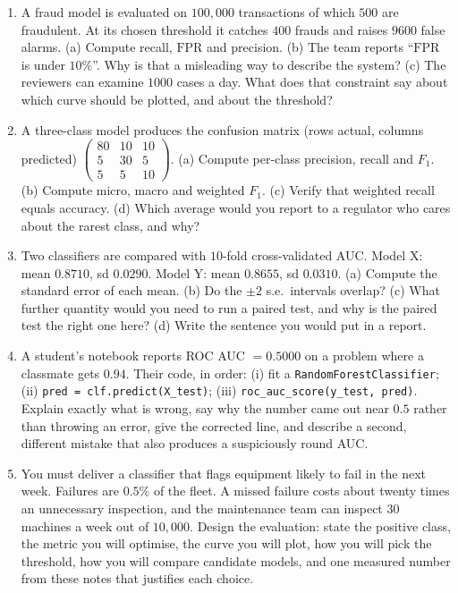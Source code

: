 \documentclass[11pt]{article}
\newcommand{\FPR}{\mathrm{FPR}}
\begin{document}
\begin{enumerate}[leftmargin=*]
  \item\label{q:pr} A fraud model is evaluated on $100{,}000$ transactions of
    which $500$ are fraudulent. At its chosen threshold it catches $400$ frauds
    and raises $9600$ false alarms. (a) Compute recall, $\FPR$ and precision.
    (b) The team reports ``$\FPR$ is under $10\%$''. Why is that a misleading
    way to describe the system? (c) The reviewers can examine $1000$ cases a
    day. What does that constraint say about which curve should be plotted, and
    about the threshold?

  \item\label{q:multi} A three-class model produces the confusion matrix
    (rows actual, columns predicted)
    $\begin{pmatrix} 80 & 10 & 10\\ 5 & 30 & 5\\ 5 & 5 & 10 \end{pmatrix}$.
    (a) Compute per-class precision, recall and $F_1$. (b) Compute micro, macro
    and weighted $F_1$. (c) Verify that weighted recall equals accuracy.
    (d) Which average would you report to a regulator who cares about the rarest
    class, and why?

  \item\label{q:select} Two classifiers are compared with $10$-fold
    cross-validated AUC. Model X: mean $0.8710$, sd $0.0290$. Model Y: mean
    $0.8655$, sd $0.0310$. (a) Compute the standard error of each mean. (b) Do
    the $\pm 2$ s.e.\ intervals overlap? (c) What further quantity would you need
    to run a paired test, and why is the paired test the right one here?
    (d) Write the sentence you would put in a report.

  \item\label{q:debug} A student's notebook reports ROC AUC $= 0.5000$ on a
    problem where a classmate gets $0.94$. Their code, in order: (i) fit a
    \texttt{RandomForestClassifier}; (ii) \texttt{pred = clf.predict(X\_test)};
    (iii) \texttt{roc\_auc\_score(y\_test, pred)}. Explain exactly what is wrong,
    say why the number came out near $0.5$ rather than throwing an error, give
    the corrected line, and describe a second, different mistake that also
    produces a suspiciously round AUC.

  \item\label{q:design} You must deliver a classifier that flags equipment
    likely to fail in the next week. Failures are $0.5\%$ of the fleet. A missed
    failure costs about twenty times an unnecessary inspection, and the
    maintenance team can inspect $30$ machines a week out of $10{,}000$. Design
    the evaluation: state the positive class, the metric you will optimise, the
    curve you will plot, how you will pick the threshold, how you will compare
    candidate models, and one measured number from these notes that justifies
    each choice.
\end{enumerate}
\end{document}
